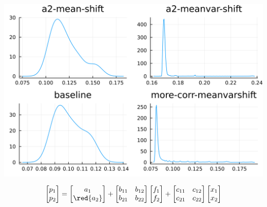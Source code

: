 \documentclass[
  ignorenonframetext,
]{beamer}
\begin{document}
\begin{frame}{}
\protect\hypertarget{section-5}{}
\begin{center}\includegraphics[width=0.95\paperheight]{complexity_files/figure-beamer/unnamed-chunk-27-1} \end{center}

\[
\begin{bmatrix}
 p_1 \\ p_2
\end{bmatrix} =
\begin{bmatrix}
 a_1 \\ \red{a_2}
\end{bmatrix}
 + 
 \begin{bmatrix}
 b_{11} & b_{12} \\
 b_{21} & b_{22}
\end{bmatrix}
\begin{bmatrix}
 f_1 \\ f_2
\end{bmatrix}
+
 \begin{bmatrix}
 c_{11} & c_{12} \\
 c_{21} & c_{22}
\end{bmatrix}
\begin{bmatrix}
 x_1 \\ x_2
\end{bmatrix}
\]
\end{frame}
\end{document}
